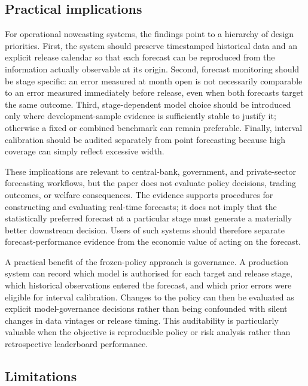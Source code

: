 \subsection{Practical implications}
\label{subsec:implications}

For operational nowcasting systems, the findings point to a hierarchy of
design priorities.  First, the system should preserve timestamped historical
data and an explicit release calendar so that each forecast can be reproduced
from the information actually observable at its origin.  Second, forecast
monitoring should be stage specific: an error measured at month open is not
necessarily comparable to an error measured immediately before release, even
when both forecasts target the same outcome.  Third, stage-dependent model
choice should be introduced only where development-sample evidence is
sufficiently stable to justify it; otherwise a fixed or combined benchmark can
remain preferable.  Finally, interval calibration should be audited separately
from point forecasting because high coverage can simply reflect excessive
width.

These implications are relevant to central-bank, government, and private-sector
forecasting workflows, but the paper does not evaluate policy decisions,
trading outcomes, or welfare consequences.  The evidence supports procedures
for constructing and evaluating real-time forecasts; it does not imply that
the statistically preferred forecast at a particular stage must generate a
materially better downstream decision.  Users of such systems should therefore
separate forecast-performance evidence from the economic value of acting on
the forecast.

A practical benefit of the frozen-policy approach is governance.  A production
system can record which model is authorised for each target and release stage,
which historical observations entered the forecast, and which prior errors
were eligible for interval calibration.  Changes to the policy can then be
evaluated as explicit model-governance decisions rather than being confounded
with silent changes in data vintages or release timing.  This auditability is
particularly valuable when the objective is reproducible policy or risk
analysis rather than retrospective leaderboard performance.

\subsection{Limitations}
\label{subsec:limitations}

